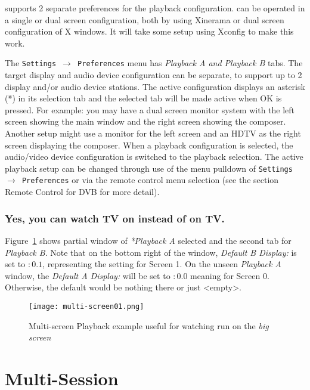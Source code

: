 \CGG{} supports 2 separate preferences for the playback configuration.  \CGG{} can be operated in a single or dual screen configuration, both by using Xinerama or dual screen configuration of X windows.  It will take some setup using Xconfig to make this work.

The \texttt{Settings $\rightarrow$ Preferences} menu has \textit{Playback A and Playback B} tabs.  The target display and audio device configuration can be separate, to support up to 2 display and/or audio device stations.  The active configuration displays an asterisk (*) in its selection tab and the selected tab will be made active when OK is pressed.  For example: you may have a dual screen monitor system with the left screen showing the \CGG{} main window and the right screen showing the composer.  Another setup might use a monitor for the left screen and an HDTV as the right screen displaying the composer.  When a playback configuration is selected, the audio/video device configuration is switched to the playback selection.  The active playback setup can be changed through use of the menu pulldown of \texttt{Settings $\rightarrow$ Preferences} or via the remote control menu selection (see the section Remote Control for DVB for more detail). 

\subsubsection*{Yes, you can watch TV on \CGG{} instead of \CGG{} on TV.}%
\label{ssub:watch_tv_on_cinelerra}

Figure~\ref{fig:multi-screen01} shows partial window of \textit{*Playback A} selected and the second tab for \textit{Playback B}.  Note that on the bottom right of the window, \textit{Default B Display:} is set to $:0.1$, representing the setting for Screen 1.  On the unseen \textit{Playback A} window, the \textit{Default A Display:} will be set to $:0.0$ meaning for Screen 0.  Otherwise, the default would be nothing there or just <empty>.

\begin{figure}[htpb]
    \centering
    \texttt{[image: multi-screen01.png]}
    \caption{Multi-screen Playback example useful for watching \CGG{} run on the \textit{big screen}}
    \label{fig:multi-screen01}
\end{figure}

\section{Multi-Session}%
\label{sec:multi_session}

